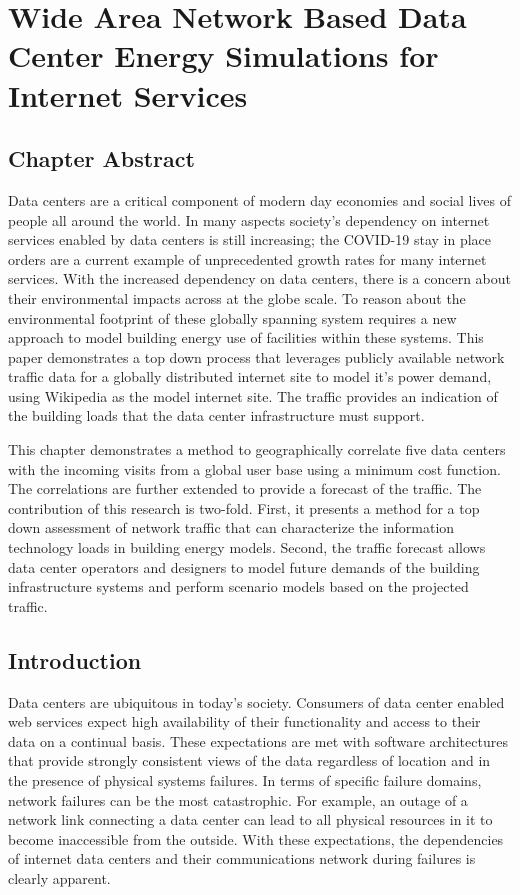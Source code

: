 \chapter{Wide Area Network Based Data Center Energy Simulations for Internet Services}
\label{chp:traffic}

\section{Chapter Abstract}
Data centers are a critical component of modern day economies and social lives of people all around the world. In many aspects society’s dependency on internet services enabled by data centers is still increasing; the COVID-19 stay in place orders are a current example of unprecedented growth rates for many internet services. With the increased dependency on data centers, there is a concern about their environmental impacts across at the globe scale. To reason about the environmental footprint of these globally spanning system requires a new approach to model building energy use of facilities within these systems. This paper demonstrates a top down process that leverages publicly available network traffic data for a globally distributed internet site to model it’s power demand, using Wikipedia as the model internet site. The traffic provides an indication of the building loads that the data center infrastructure must support.  

This chapter demonstrates a method to geographically correlate five data centers with the incoming visits from a global user base using a minimum cost function. The correlations are further extended to provide a forecast of the traffic. The contribution of this research is two-fold. First, it presents a method for a top down assessment of network traffic that can characterize the information technology loads in building energy models. Second, the traffic forecast allows data center operators and designers to model future demands of the building infrastructure systems and perform scenario models based on the projected traffic. 

\section{Introduction}

Data centers are ubiquitous in today’s society. Consumers of data center enabled web services expect high availability of their functionality and access to their data on a continual basis. These expectations are met with software architectures that provide strongly consistent views of the data regardless of location and in the presence of physical systems failures. In terms of specific failure domains, network failures can be the most catastrophic. For example, an outage of a network link connecting a data center can lead to all physical resources in it to become inaccessible from the outside. With these expectations, the dependencies of internet data centers and their communications network during failures is clearly apparent.

